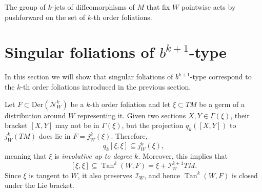 \documentclass[10pt]{amsart}
\newcommand{\A}{{\mathcal{A}}}
\newcommand{\Tan}{{\operatorname{Tan}}}
\numberwithin{theoremalpha}{section}
\numberwithin{equation}{section}
\numberwithin{definition}{section}
\numberwithin{theorem}{section}
\numberwithin{proposition}{section}
\numberwithin{lemma}{section}
\numberwithin{example}{section}
\numberwithin{remark}{section}
\numberwithin{corollary}{section}
\numberwithin{question}{section}
\numberwithin{problem}{section}
\numberwithin{assumption}{section}
\theoremstyle{named}
\numberwithin{equation}{section}
\begin{document}
\begin{lemma}  \label{lem:factoringViakJets}
The group of $k$-jets of diffeomorphisms of $M$ that fix $W$ pointwise acts by pushforward on the set of $k$-th order foliations. 
\end{lemma}




\section{Singular foliations of $b^{k+1}$-type}\label{sec:singfols}
In this section we will show that singular foliations of $b^{k+1}$-type correspond to the $k$-th order foliations introduced in the previous section.

%

Let $F \subset \mathrm{Der}(\mathcal{N}_{W}^{k})$ be a $k$-th order foliation and let $\xi \subset TM$ be a germ of a distribution around $W$ representing it. Given two sections $X, Y \in \Gamma(\xi)$, their bracket $[X,Y]$ may not be in $\Gamma(\xi)$, but the projection $q_{k}([X,Y])$ to $j_{W}^{k}(TM)$ does lie in $F = j_{W}^{k}(\xi)$. Therefore, 
\[
q_{k}[\xi, \xi] \subseteq j^{k}_{W}(\xi),
\]
meaning that $\xi$ is \emph{involutive up to degree $k$}. Moreover, this implies that 
\[
[\xi, \xi] \subseteq \Tan^{k}(W, F) = \xi + \mathcal{I}_W^{k+1} TM. 
\]
Since $\xi$ is tangent to $W$, it also preserves $\mathcal{I}_W$, and hence $\Tan^{k}(W, F)$ is closed under the Lie bracket. 
\end{document}
